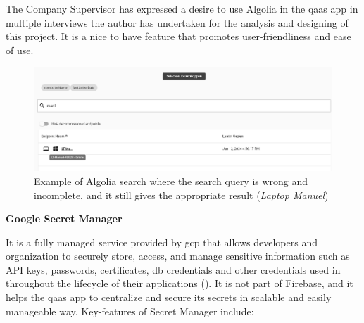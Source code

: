 The Company Supervisor has expressed a desire to use Algolia in the \acrshort{qaas} app in multiple interviews
the author has undertaken for the analysis and designing of this project. It is a nice to have feature that
promotes user-friendliness and ease of use.

\begin{figure}[H]
      \centering
      \includegraphics[width=1.0\textwidth]{Figures/Algolia Seach.png}
      \caption{Example of Algolia search where the search query is wrong and incomplete, and it still gives
            the appropriate result (\textit{Laptop Manuel})}
\end{figure}

\textbf{Google Secret Manager}

It is a fully managed service provided by \acrshort{gcp} that allows developers and organization to securely store,
access, and manage sensitive information such as API keys, passwords, certificates, \acrshort{db} credentials and other
credentials used in throughout the lifecycle of their applications
(\textit{\cite{googlesecretmanager}}). It is not part of Firebase, and it helps the \acrshort{qaas} app to centralize and
secure its secrets in scalable and easily manageable way. Key-features of Secret Manager include:

